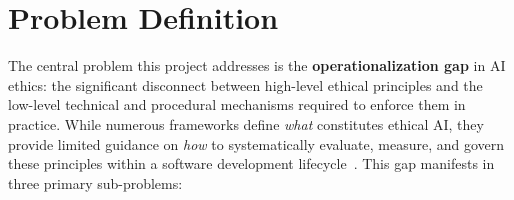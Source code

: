 \chapter{Problem Definition}
\label{ch:problem}

The central problem this project addresses is the \textbf{operationalization gap} in AI ethics: the significant disconnect between high-level ethical principles and the low-level technical and procedural mechanisms required to enforce them in practice. While numerous frameworks define \textit{what} constitutes ethical AI, they provide limited guidance on \textit{how} to systematically evaluate, measure, and govern these principles within a software development lifecycle~\cite{mittelstadt2019principles,hagendorff2020ethics}. This gap manifests in three primary sub-problems:

